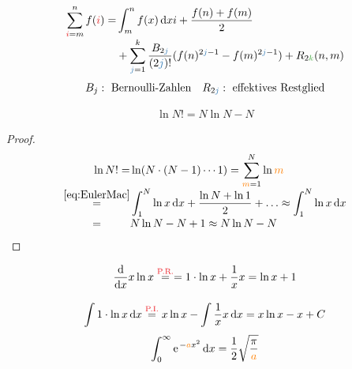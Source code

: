\begin{defnbox}\nospacing
  \begin{defn}
    \begin{align}
      \sum_{\idxi=m}^{n}f(\idxi)=&\int_{m}^n f(x)\diff xi+\frac{f(n)+f(m)}{2}\label{eq:EulerMac}\nalign
      &+\sum_{\idxj=1}^{k}\frac{B_{2\idxj}}{(2\idxj)!}(f(n)^{2\idxj-1}-f(m)^{2\idxj-1})+R_{2\idxk}(n,m)\nonumber
    \end{align}
    \begin{align*}
      B_j: \text{ Bernoulli-Zahlen}&&R_{2\idxj}: \text{ effektives Restglied}
    \end{align*}
  \end{defn}
\end{defnbox}
\begin{defnbox}\nospacing
  \begin{defn}
    \begin{align}
      \ln N!=N\ln N-N\label{eq:Stirling}
    \end{align}
  \end{defn}
\end{defnbox}
\begin{proofbox}\nospacing
   \begin{proof}
     \begin{align*}
       \ln N!=&\ln (N\cdot(N-1)\cdots1)=\sum_{\idxm=1}^{N}\ln\idxm\nalign
                \eqs{\cref{eq:EulerMac}}&\int_{1}^{N}\ln x\diff x+\frac{\ln N+\ln 1}{2}+\ldots\approx\int_{1}^{N}\ln x\diff x\nalign
                                          \eqs{\hphantom{\cref{eq:EulerMac}}}&N\ln N-N+1\approx N\ln N-N
     \end{align*}
   \end{proof} 
\end{proofbox}
\begin{lawbox}
  \begin{law}[Differentiale]
    \begin{align}
      \frac{\diff}{\diff x}x\ln x\eqs{\rd{\text{P.R.}}}=1\cdot\ln x+\frac{1}{x}x=\ln x+1\label{eq:xlnx}
    \end{align}
  \end{law}
\end{lawbox}
\begin{lawbox}\nospacing
  \begin{law}[Integrale]
    \begin{align}
      \int 1\cdot\ln x\diff x\eqs{\rd{\text{P.I.}}}x\ln x-\int \frac{1}{x}x\diff x=x\ln x-x+C
    \end{align}
    \begin{align}
    \int_{0}^{\infty}\e^{-\mca x^2}\diff x=\frac{1}{2}\sqrt{\frac{\pi}{\mca}}\label{eq:exa2}
    \end{align}
  \end{law}
\end{lawbox}
